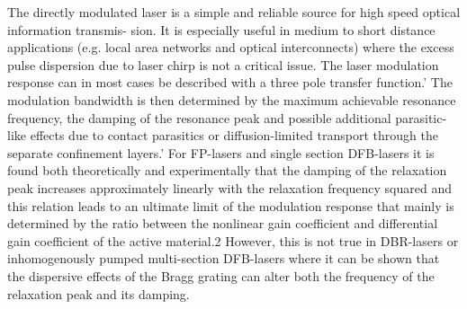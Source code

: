 The directly modulated laser is a simple and reliable source for high speed optical information transmis- sion. It is especially useful in medium to short distance applications (e.g. local area networks and optical interconnects) where the excess pulse dispersion due to laser chirp is not a critical issue. The laser modulation response can in most cases be described with a three pole transfer function.' The modulation bandwidth is then determined by the maximum achievable resonance frequency, the damping of the resonance peak and possible additional parasitic-like effects due to contact parasitics or diffusion-limited transport through the separate confinement layers.' For FP-lasers and single section DFB-lasers it is found both theoretically and experimentally that the damping of the relaxation peak increases approximately linearly with the relaxation frequency squared and this relation leads to an ultimate limit of the modulation response that mainly is determined by the ratio between the nonlinear gain coefficient and differential gain coefficient of the active material.2 However, this is not true in DBR-lasers or inhomogenously pumped multi-section DFB-lasers where it can be shown that the dispersive effects of the Bragg grating can alter both the frequency of the relaxation peak and its damping.




